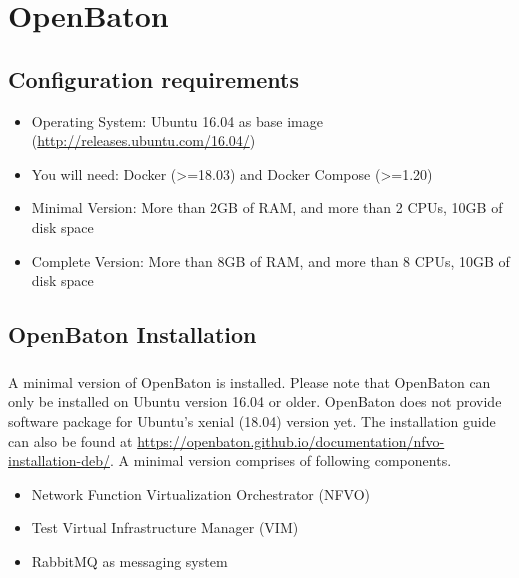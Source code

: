 \chapter{OpenBaton}
\label{ch:ob}

	\section{Configuration requirements}
	\label{sec:Configuration requirements to run OpenBaton on a single server or VM}
	\begin{itemize}
		\item Operating System: Ubuntu 16.04 as base image (\hyperlink{name}{http://releases.ubuntu.com/16.04/})
		\item You will need: Docker (>=18.03) and Docker Compose (>=1.20)
		\item Minimal Version: More than 2GB of RAM, and more than 2 CPUs, 10GB of disk space
		\item Complete Version: More than 8GB of RAM, and more than 8 CPUs, 10GB of disk space
	\end{itemize}

	\section{OpenBaton Installation}
	\label{OpenBaton Installation}
		\paragraph{}
		A minimal version of OpenBaton is installed. Please note that OpenBaton can only be installed on Ubuntu version 16.04 or older. OpenBaton does not provide software package for Ubuntu’s xenial (18.04) version yet. The installation guide can also be found at \hyperlink{name}{https://openbaton.github.io/documentation/nfvo-installation-deb/}. A minimal version comprises of following components.
		\begin{itemize}
			\item Network Function Virtualization Orchestrator (NFVO)
			\item Test Virtual Infrastructure Manager (VIM)
			\item RabbitMQ as messaging system
		\end{itemize}

